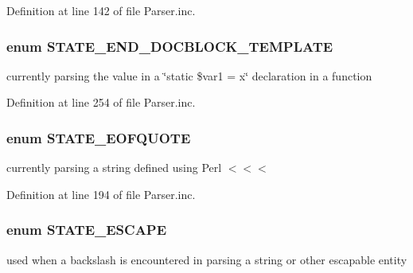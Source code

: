 \-Definition at line 142 of file \-Parser.\-inc.

\hypertarget{_parser_8inc_adb84867ab0d4a49a8fcc34005bd949f6}{
\subsubsection[{\-S\-T\-A\-T\-E\-\_\-\-E\-N\-D\-\_\-\-D\-O\-C\-B\-L\-O\-C\-K\-\_\-\-T\-E\-M\-P\-L\-A\-T\-E}]{\setlength{\rightskip}{0pt plus 5cm}enum {\bf \-S\-T\-A\-T\-E\-\_\-\-E\-N\-D\-\_\-\-D\-O\-C\-B\-L\-O\-C\-K\-\_\-\-T\-E\-M\-P\-L\-A\-T\-E}}}\label{_parser_8inc_adb84867ab0d4a49a8fcc34005bd949f6}
currently parsing the value in a \char`\"{}static \$var1 = x\char`\"{} declaration in a function 

\-Definition at line 254 of file \-Parser.\-inc.

\hypertarget{_parser_8inc_a577b022d12e07dc7ffee464541118a17}{
\subsubsection[{\-S\-T\-A\-T\-E\-\_\-\-E\-O\-F\-Q\-U\-O\-T\-E}]{\setlength{\rightskip}{0pt plus 5cm}enum {\bf \-S\-T\-A\-T\-E\-\_\-\-E\-O\-F\-Q\-U\-O\-T\-E}}}\label{_parser_8inc_a577b022d12e07dc7ffee464541118a17}
currently parsing a string defined using \-Perl $<$$<$$<$ 

\-Definition at line 194 of file \-Parser.\-inc.

\hypertarget{_parser_8inc_a67d501e9252a1e649b8bc2c8e399e240}{
\subsubsection[{\-S\-T\-A\-T\-E\-\_\-\-E\-S\-C\-A\-P\-E}]{\setlength{\rightskip}{0pt plus 5cm}enum {\bf \-S\-T\-A\-T\-E\-\_\-\-E\-S\-C\-A\-P\-E}}}\label{_parser_8inc_a67d501e9252a1e649b8bc2c8e399e240}
used when a backslash is encountered in parsing a string or other escapable entity 

